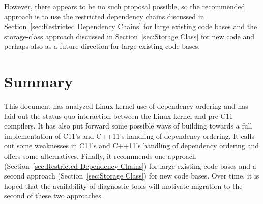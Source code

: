 \documentclass[letterpaper,twocolumn,10pt]{article}
\begin{document}
However, there appears to be no such proposal possible, so the
recommended approach is to use the restricted dependency chains
discussed in
Section~\ref{sec:Restricted Dependency Chains}
for large existing code bases and the storage-class approach discussed in
Section~\ref{sec:Storage Class}
for new code and perhaps also as a future direction for large existing
code bases.

\section{Summary}
\label{sec:Summary}

This document has analyzed Linux-kernel use of dependency ordering and
has laid out the status-quo interaction between the Linux kernel and
pre-C11 compilers.
It has also put forward some possible ways of building towards
a full implementation of C11's and
C++11's handling of dependency ordering.
It calls out some weaknesses in C11's and C++11's handling
of dependency ordering and offers some alternatives.
Finally, it recommends one approach
(Section~\ref{sec:Restricted Dependency Chains})
for large existing code bases and a second approach
(Section~\ref{sec:Storage Class})
for new code bases.
Over time, it is hoped that the availability of diagnostic tools will
motivate migration to the second of these two approaches.

%
%

%







\end{document}

